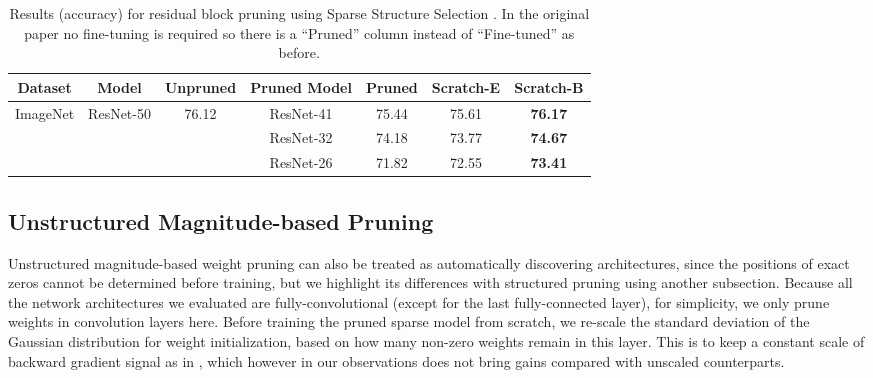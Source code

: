 \vspace{-0.5ex}
\renewcommand{\arraystretch}{1.2}
\begin{table}[!htbp]
\small
\centering
\begin{tabular}{l|c|ccccc}
\hline
\multicolumn{1}{c|}{Dataset} & Model                      & Unpruned               & Pruned Model & Pruned                          & Scratch-E  & Scratch-B                      \\ \hline
\multirow{3}{*}{ImageNet}    & \multirow{3}{*}{ResNet-50} & \multirow{3}{*}{76.12} & ResNet-41    & 75.44                           & 75.61     & \textbf{76.17} \\
                             &                            &                        & ResNet-32    & 74.18 & 73.77    & \textbf{74.67}       \\
                             &                            &                        & ResNet-26    & 71.82                           & 72.55 & \textbf{73.41}    \\ \hline
\end{tabular}
\vspace{1.5ex}
\caption{Results (accuracy) for residual block pruning using Sparse Structure Selection \citep{huang2018data}. In the original paper no fine-tuning is required so there is a ``Pruned'' column instead of ``Fine-tuned'' as before. 
}
\label{sparse}
\vspace{-3ex}
\end{table}

\subsection{Unstructured Magnitude-based Pruning \citep{han2015learning}}
\label{sec:unstructured}
Unstructured magnitude-based weight pruning \citep{han2015learning} can also be treated as automatically discovering architectures, since the positions of exact zeros cannot be determined before training, but we highlight its differences with structured pruning using another subsection. 
Because all the network architectures we evaluated are fully-convolutional (except for the last fully-connected layer), for simplicity, we only prune weights in convolution layers here. Before training the pruned sparse model from scratch, we re-scale the standard deviation of the Gaussian distribution for weight initialization, based on how many non-zero weights remain in this layer. This is to keep a constant scale of backward gradient signal as in  \citep{he2015delving}, which however in our observations does not bring gains compared with unscaled counterparts.



